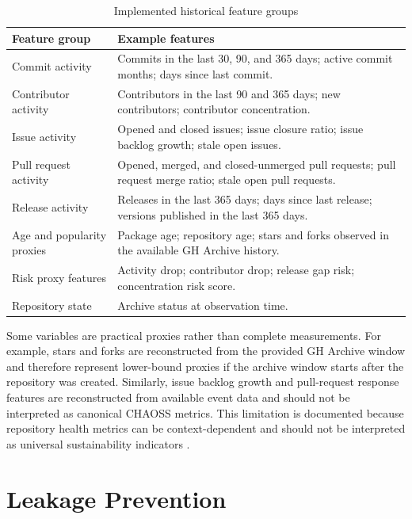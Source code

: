 \begin{table}[htbp]
\centering
\caption{Implemented historical feature groups}
\label{tab:method-feature-groups}
\begin{tabular}{p{} p{}}
\hline
\textbf{Feature group} & \textbf{Example features} \\
\hline
Commit activity &
Commits in the last 30, 90, and 365 days; active commit months; days since last commit. \\
Contributor activity &
Contributors in the last 90 and 365 days; new contributors; contributor concentration. \\
Issue activity &
Opened and closed issues; issue closure ratio; issue backlog growth; stale open issues. \\
Pull request activity &
Opened, merged, and closed-unmerged pull requests; pull request merge ratio; stale open pull requests. \\
Release activity &
Releases in the last 365 days; days since last release; versions published in the last 365 days. \\
Age and popularity proxies &
Package age; repository age; stars and forks observed in the available GH Archive history. \\
Risk proxy features &
Activity drop; contributor drop; release gap risk; concentration risk score. \\
Repository state &
Archive status at observation time. \\
\hline
\end{tabular}
\end{table}

Some variables are practical proxies rather than complete measurements. For example, stars and forks are reconstructed from the provided GH Archive window and therefore represent lower-bound proxies if the archive window starts after the repository was created. Similarly, issue backlog growth and pull-request response features are reconstructed from available event data and should not be interpreted as canonical CHAOSS metrics. This limitation is documented because repository health metrics can be context-dependent and should not be interpreted as universal sustainability indicators \cite{yehudi2023contextfree}.

\section{Leakage Prevention}
\label{sec:method-leakage-prevention}

